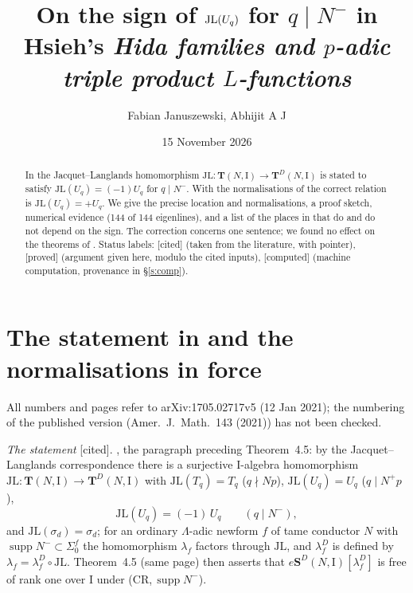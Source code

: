 \documentclass[11pt]{amsart}
\title[The sign of $\mathrm{JL}(U_q)$, $q\mid N^-$, in Hsieh's paper]{On the sign of $\JL(U_q)$ for $q\mid N^-$ in Hsieh's \emph{Hida families and $p$-adic triple product $L$-functions}}
\author{Fabian Januszewski, Abhijit A J}
\date{15 November 2026}
\theoremstyle{plain}
\theoremstyle{remark}
\newcommand{\I}{\mathrm{I}}
\newcommand{\T}{\mathbf{T}}
\newcommand{\JL}{\mathrm{JL}}
\newcommand{\eS}{e\mathbf{S}}
\newcommand{\st}[1]{\textup{\textsf{[#1]}}}
\begin{document}
\begin{abstract}
In \cite[\S4.5, p.~34]{Hs} the Jacquet--Langlands homomorphism $\JL:\T(N,\I)\to\T^D(N,\I)$ is stated to satisfy
$\JL(U_q)=(-1)U_q$ for $q\mid N^-$. With the normalisations of \cite{Hs} the correct relation is $\JL(U_q)=+U_q$. We
give the precise location and normalisations, a proof sketch, numerical evidence (144 of 144 eigenlines), and a list of
the places in \cite{Hs} that do and do not depend on the sign. The correction concerns one sentence; we found no
effect on the theorems of \cite{Hs}.
Status labels: \st{cited} (taken from the literature, with pointer), \st{proved} (argument given here, modulo the cited
inputs), \st{computed} (machine computation, provenance in \S\ref{s:comp}).
\end{abstract}
\maketitle

\section{The statement in \texorpdfstring{\cite{Hs}}{[Hs]} and the normalisations in force}\label{s:stmt}
All numbers and pages refer to arXiv:1705.02717v5 (12 Jan 2021); the numbering of the published version
(Amer.\ J.\ Math.\ 143 (2021)) has not been checked.

\emph{The statement} \st{cited}. \cite[\S4.5 ``Hecke algebras and primitive $\Lambda$-adic forms'', p.~34]{Hs}, the
paragraph preceding Theorem~4.5: by the Jacquet--Langlands correspondence there is a surjective $\I$-algebra
homomorphism $\JL:\T(N,\I)\to\T^D(N,\I)$ with $\JL(T_q)=T_q$ ($q\nmid Np$), $\JL(U_q)=U_q$ ($q\mid N^+p$),
\[\JL(U_q)=(-1)\,U_q\qquad(q\mid N^-),\]
and $\JL(\sigma_d)=\sigma_d$; for an ordinary $\Lambda$-adic newform $f$ of tame conductor $N$ with
$\operatorname{supp}N^-\subset\Sigma^f_0$ the homomorphism $\lambda_f$ factors through $\JL$, and $\lambda^D_f$ is defined
by $\lambda_f=\lambda^D_f\circ\JL$. Theorem~4.5 (same page) then asserts that $\eS^D(N,\I)[\lambda^D_f]$ is free of rank one
over $\I$ under (CR,\,$\operatorname{supp}N^-$).
\end{document}
